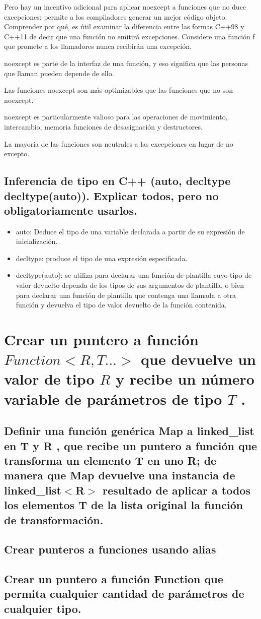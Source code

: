 \documentclass[10pt]{article}
\begin{document}
Pero hay un incentivo adicional para aplicar noexcept a funciones que no
duce excepciones: permite a los compiladores generar un mejor código objeto. Comprender
por qué, es útil examinar la diferencia entre las formas C++98 y C++11 de decir
que una función no emitirá excepciones. Considere una función f que promete a los llamadores
nunca recibirán una excepción.

noexcept es parte de la interfaz de una función, y eso significa que las personas que llaman pueden
depende de ello.

 Las funciones noexcept son más optimizables que las funciones que no son noexcept.

 noexcept es particularmente valioso para las operaciones de movimiento, intercambio, memoria
funciones de desasignación y destructores.

 La mayoría de las funciones son neutrales a las excepciones en lugar de no excepto.
\subsection{Inferencia de tipo en C++ (auto, decltype decltype(auto)). Explicar todos, pero no obligatoriamente usarlos.}

\begin{itemize}
	\item auto: Deduce el tipo de una variable declarada a partir de su expresión de inicialización.
	\item decltype: produce el tipo de una expresión especificada.
	\item decltype(auto): se utiliza para declarar una función de plantilla cuyo tipo de valor devuelto dependa de los tipos de sus argumentos de plantilla, o bien para declarar una función de plantilla que contenga una llamada a otra función y devuelva el tipo de valor devuelto de la función contenida.
\end{itemize}

\vspace{2em}
\section{Crear un puntero a función $ Function<R, T...> $ que devuelve un valor de tipo $ R $ y recibe un número variable de parámetros de tipo $ T $ .}

\subsection{Definir una función genérica Map a linked\_list en T y R , que recibe un puntero a función que transforma un elemento T en uno R; de manera que Map devuelve una instancia de linked\_list$ < $R$ > $ resultado de aplicar a todos los elementos T de la lista original la función de transformación.}

\subsection{Crear punteros a funciones usando alias }

\subsection{Crear un puntero a función Function que permita cualquier cantidad de parámetros de cualquier tipo.}
\end{document}
